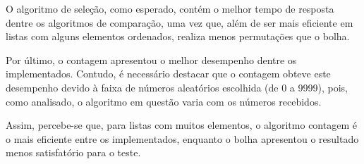 O algoritmo de seleção, como esperado, contém o melhor tempo de resposta dentre os algoritmos de comparação, uma vez que, além de ser mais eficiente em listas com alguns elementos ordenados, realiza menos permutações que o bolha. 

Por último, o contagem apresentou o melhor desempenho dentre os implementados. Contudo, é necessário destacar que o contagem obteve este desempenho devido à faixa de números aleatórios escolhida (de 0 a 9999), pois, como analisado, o algoritmo em questão varia com os números recebidos.

Assim, percebe-se que, para listas com muitos elementos, o algoritmo contagem é o mais eficiente entre os implementados, enquanto o bolha apresentou o resultado menos satisfatório para o teste.

